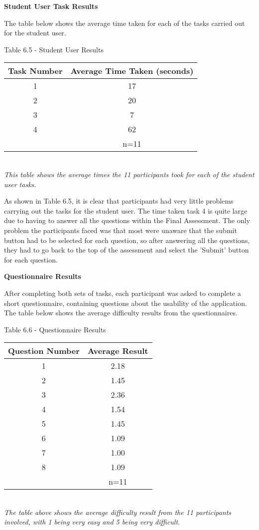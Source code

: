 \documentclass{l3proj}
\begin{document}
\textbf{Student User Task Results}

The table below shows the average time taken for each of the tasks carried out for the student user.

\begin{center}
Table 6.5 - Student User Results\\
\begin{tabular}{|c|c|}
\hline \textbf{Task Number} & \textbf{Average Time Taken (seconds)}\\
\hline
\hline 1 & 17\\
\hline 2 & 20\\
\hline 3 & 7\\
\hline 4 & 62\\
\hline & n=11\\
\hline
\end{tabular}\\
\textit{{\small This table shows the average times the 11 participants took for each of the student user tasks.}}
\end{center}


As shown in Table 6.5, it is clear that participants had very little problems carrying out the tasks for the student user. The time taken task 4 is quite large due to having to answer all the questions within the Final Assessment. The only problem the participants faced was that most were unaware that the submit button had to be selected for each question, so after answering all the questions, they had to go back to the top of the assessment and select the 'Submit' button for each question.

\textbf{Questionnaire Results}

After completing both sets of tasks, each participant was asked to complete a short questionnaire, containing questions about the usability of the application. The table below shows the average difficulty results from the questionnaires.

\begin{center}
Table 6.6 - Questionnaire Results\\
\begin{tabular}{|c|c|}
\hline \textbf{Question Number} & \textbf{Average Result}\\
\hline
\hline 1 & 2.18\\
\hline 2  & 1.45\\
\hline 3 & 2.36\\
\hline 4 & 1.54\\
\hline 5 & 1.45\\
\hline 6 & 1.09\\
\hline 7 & 1.00\\
\hline 8 & 1.09\\
\hline & n=11\\
\hline
\end{tabular}\\
\textit{{\small The table above shows the average difficulty result from the 11 participants involved, with 1 being very easy and 5 being very difficult.}}
\end{center}
\end{document}
